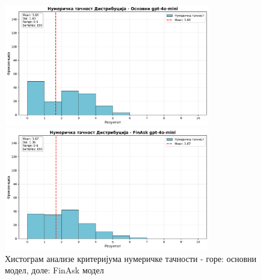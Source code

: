 \begin{figure}[h]
    \centering
    \includegraphics[width=0.8\textwidth]{images/osnovni/criteria_analysis_numerical_accuracy_histogram.png}
    
    \vspace{0.5cm}
    
    \includegraphics[width=0.8\textwidth]{images/FinAsk/criteria_analysis_numerical_accuracy_histogram.png}
    \caption{Хистограм анализе критеријума нумеричке тачности - горе: основни модел, доле: FinAsk модел}
    \label{fig:comparison_numerical}
\end{figure}
